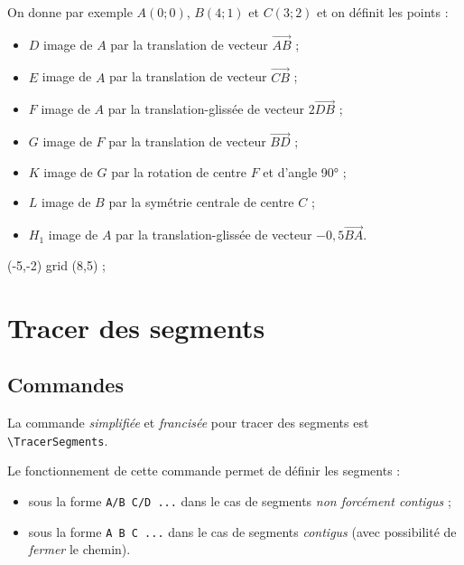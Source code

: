 \documentclass[french,a4paper,11pt]{article}
\begin{document}
\pagebreak

\begin{noteblock}
On donne par exemple $A(0;0)$, $B(4;1)$ et $C(3;2)$ et on définit les points :
%
\begin{itemize}
	\item $D$ image de $A$ par la translation de vecteur $\overrightarrow{AB}$ ;
	\item $E$ image de $A$ par la translation de vecteur $\overrightarrow{CB}$ ;
	\item $F$ image de $A$ par la translation-glissée de vecteur $2\overrightarrow{DB}$ ;
	\item $G$ image de $F$ par la translation de vecteur $\overrightarrow{BD}$ ;
	\item $K$ image de $G$ par la rotation de centre $F$ et d'angle 90° ;
	\item $L$ image de $B$ par la symétrie centrale de centre $C$ ;
	\item $H_1$ image de $A$ par la translation-glissée de vecteur $-0{,}5\overrightarrow{BA}$.
\end{itemize}
\vspace*{-\baselineskip}\leavevmode
\end{noteblock}

\begin{DemoCode}
 (-5,-2) grid (8,5) ;
\end{DemoCode}

\pagebreak

\section{Tracer des segments}

\subsection{Commandes}

\begin{cautionblock}
La commande \textit{simplifiée} et \textit{francisée} pour tracer des segments est \texttt{\textbackslash TracerSegments}.

\smallskip

Le fonctionnement de cette commande permet de définir les segments :

\begin{itemize}
	\item sous la forme \texttt{A/B C/D ...} dans le cas de segments \textit{non forcément contigus} ;
	\item sous la forme \texttt{A B C ...} dans le cas de segments \textit{contigus} (avec possibilité de \textit{fermer} le chemin).
\end{itemize}
\end{cautionblock}
\end{document}
